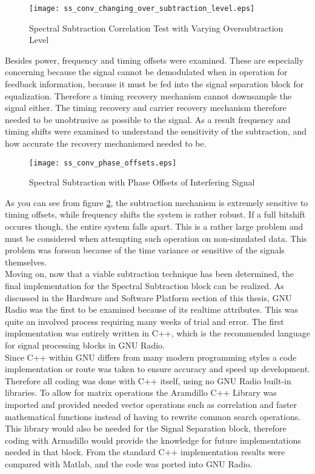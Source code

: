 \begin{figure}[!ht]\label{power_delta}  
\centering
\texttt{[image: ss\_conv\_changing\_over\_subtraction\_level.eps]}
\caption{Spectral Subtraction Correlation Test with Varying Oversubtraction Level}
\end{figure}

Besides power, frequency and timing offsets were examined.  These are especially concerning because the signal cannot be demodulated when in operation for feedback information, because it must be fed into the signal separation block for equalization.  Therefore a timing recovery mechanism cannot downsample the signal either.  The timing recovery and carrier recovery mechanism therefore needed to be unobtrusive as possible to the signal.  As a result frequency and timing shifts were examined to understand the sensitivity of the subtraction, and how accurate the recovery mechanismed needed to be.

\begin{figure}[!ht]\label{shifting}
\centering
\texttt{[image: ss\_conv\_phase\_offsets.eps]}
\caption{Spectral Subtraction with Phase Offsets of Interfering Signal}
\end{figure}

As you can see from figure \ref{shifting}, the subtraction mechanism is extremely sensitive to timing offsets, while frequency shifts the system is rather robust.  If a full bitshift occures though, the entire system falls apart.  This is a rather large problem and must be considered when attempting such operation on non-simulated data.  This problem was forsean because of the time variance or sensitive of the signals themselves. \\

Moving on, now that a viable subtraction technique has been determined, the final implementation for the Spectral Subtraction block can be realized.  As discussed in the Hardware and Software Platform section of this thesis, GNU Radio was the first to be examined because of its realtime attributes.  This was quite an involved process requiring many weeks of trial and error.  The first implementation was entirely written in C++, which is the recommended language for signal processing blocks in GNU Radio.\\  

Since C++ within GNU differs from many modern programming styles a code implementation or route was taken to ensure accuracy and speed up development.  Therefore all coding was done with C++ itself, using no GNU Radio built-in libraries\cite{gnuradioCPP}.  To allow for matrix operations the Aramdillo C++ Library\cite{armadillo} was imported and provided needed vector operations such as correlation and faster mathematical functions instead of having to rewrite common search operations.  This library would also be needed for the Signal Separation block, therefore coding with Armadillo would provide the knowledge for future implementations needed in that block.  From the standard C++ implementation results were compared with Matlab, and the code was ported into GNU Radio.\\

